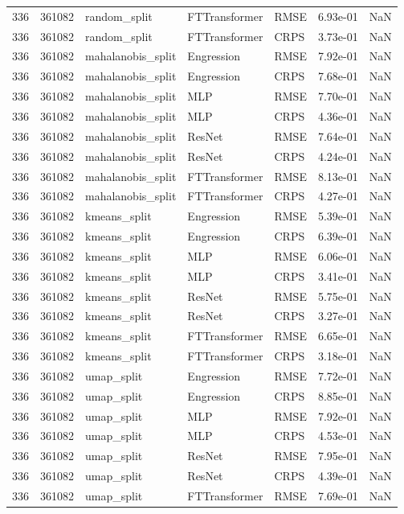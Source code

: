 \begin{tabular}{rrlllrr}
336 & 361082 & random\_split & FTTransformer & RMSE & 6.93e-01 & NaN \\
336 & 361082 & random\_split & FTTransformer & CRPS & 3.73e-01 & NaN \\
336 & 361082 & mahalanobis\_split & Engression & RMSE & 7.92e-01 & NaN \\
336 & 361082 & mahalanobis\_split & Engression & CRPS & 7.68e-01 & NaN \\
336 & 361082 & mahalanobis\_split & MLP & RMSE & 7.70e-01 & NaN \\
336 & 361082 & mahalanobis\_split & MLP & CRPS & 4.36e-01 & NaN \\
336 & 361082 & mahalanobis\_split & ResNet & RMSE & 7.64e-01 & NaN \\
336 & 361082 & mahalanobis\_split & ResNet & CRPS & 4.24e-01 & NaN \\
336 & 361082 & mahalanobis\_split & FTTransformer & RMSE & 8.13e-01 & NaN \\
336 & 361082 & mahalanobis\_split & FTTransformer & CRPS & 4.27e-01 & NaN \\
336 & 361082 & kmeans\_split & Engression & RMSE & 5.39e-01 & NaN \\
336 & 361082 & kmeans\_split & Engression & CRPS & 6.39e-01 & NaN \\
336 & 361082 & kmeans\_split & MLP & RMSE & 6.06e-01 & NaN \\
336 & 361082 & kmeans\_split & MLP & CRPS & 3.41e-01 & NaN \\
336 & 361082 & kmeans\_split & ResNet & RMSE & 5.75e-01 & NaN \\
336 & 361082 & kmeans\_split & ResNet & CRPS & 3.27e-01 & NaN \\
336 & 361082 & kmeans\_split & FTTransformer & RMSE & 6.65e-01 & NaN \\
336 & 361082 & kmeans\_split & FTTransformer & CRPS & 3.18e-01 & NaN \\
336 & 361082 & umap\_split & Engression & RMSE & 7.72e-01 & NaN \\
336 & 361082 & umap\_split & Engression & CRPS & 8.85e-01 & NaN \\
336 & 361082 & umap\_split & MLP & RMSE & 7.92e-01 & NaN \\
336 & 361082 & umap\_split & MLP & CRPS & 4.53e-01 & NaN \\
336 & 361082 & umap\_split & ResNet & RMSE & 7.95e-01 & NaN \\
336 & 361082 & umap\_split & ResNet & CRPS & 4.39e-01 & NaN \\
336 & 361082 & umap\_split & FTTransformer & RMSE & 7.69e-01 & NaN \\

\end{tabular}
